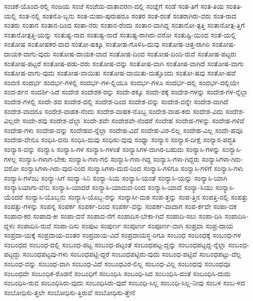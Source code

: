{ಸಂಚಿಕೆ-ಯೊಂದ-ರಲ್ಲಿ
ಸಂಜಯ
ಸಂಜೆ
ಸಂಜೆಯ-ವಾತಾವರಣ-ದಲ್ಲಿ
ಸಂಜ್ಞೆಗೆ
ಸಂಡೆ
ಸಂತ-ತಿಗೆ
ಸಂತ-ತಿಯ
ಸಂತತಿ-ಯಲ್ಲಿ
ಸಂತ-ನಲ್ಲಿ
ಸಂತನೊ-ಬ್ಬನು
ಸಂತ-ಮಹಾ-ಪುರುಷರೂ
ಸಂತರ
ಸಂತ-ರಂತೆ
ಸಂತರಾಗಿರು-ವರು
ಸಂತ-ರಾದ
ಸಂತರು
ಸಂತಾನ
ಸಂತಾನ-ದಿಂದ
ಸಂತಾ-ನರು
ಸಂತಾನ-ರೆಂದು
ಸಂತಾನ-ವಾಗಿದ್ದ
ಸಂತಾನೋ-ತ್ಪತ್ತಿ
ಸಂತಾನೋತ್ಪ-ತ್ತಿಗೆ
ಸಂತಾನೋತ್ಪತ್ತಿ-ಯನ್ನು
ಸಂತುಷ್ಟ-ನಾದ
ಸಂತುಷ್ಟ-ನಾದೆ
ಸಂತುಷ್ಟ-ರಾಗಿರು-ವರೋ
ಸಂತುಷ್ಟಿ-ಯಿಂದ
ಸಂತೆ-ಯಲ್ಲಿ
ಸಂತೋಷ
ಸಂತೋಷಕರ-ವಾದ
ಸಂತೋ-ಷಕ್ಕೂ
ಸಂತೋಷ-ಗೊಳಿಸಿ-ದುವು
ಸಂತೋಷ-ಚಿತ್ತ-ರಾಗಿರಿ
ಸಂತೋಷ-ದಾಯಕ-ವಾಗು-ವುದು
ಸಂತೋಷ-ದಾಯಕ-ವಾದ
ಸಂತೋಷ-ದಿಂದ
ಸಂತೋಷ-ದಿಂದಿ-ರುವೆ
ಸಂತೋಷ-ಪಟ್ಟರು
ಸಂತೋಷ-ಪಟ್ಟರೆ
ಸಂತೋಷ-ಪಡು-ವರು
ಸಂತೋಷ-ವನ್ನು
ಸಂತೋಷ-ವಾಗಿ
ಸಂತೋಷ-ವಾಗಿದೆ
ಸಂತೋಷ-ವಾಗು
ಸಂತೋಷ-ವಾಗು-ವುದು
ಸಂತೋಷ-ವಾಯಿತು
ಸಂತೋಷ-ವಾಯಿತು-ಮತ್ತೊಂದು
ಸಂತೋ-ಷವು
ಸಂತೋ-ಷವೆ
ಸಂದಣಿ
ಸಂದರ್ಭ
ಸಂದರ್ಭ-ಗಳಲ್ಲಿ
ಸಂದರ್ಭ-ಗಳ-ಲ್ಲಿಯೂ
ಸಂದರ್ಭ-ಗಳೂ
ಸಂದರ್ಭ-ದಲ್ಲಿ
ಸಂದರ್ಭ-ದಲ್ಲಿಯೇ
ಸಂದ-ರ್ಶನ
ಸಂದರ್ಶಿ-ಸಿದೆ
ಸಂದೇಶ
ಸಂದೇಶಕ-ರನ್ನು
ಸಂದೇ-ಶಕ್ಕೂ
ಸಂದೇ-ಶಕ್ಕೆ
ಸಂದೇಶ-ಗಳನ್ನು
ಸಂದೇಶ-ಗಳ-ನ್ನೆಲ್ಲಾ
ಸಂದೇಶ-ಗಳಲ್ಲಿ
ಸಂದೇ-ಶದ
ಸಂದೇಶ-ದಲ್ಲಿ
ಸಂದೇಶ-ದಿಂದ
ಸಂದೇಶ-ವನ್ನು
ಸಂದೇಶ-ವನ್ನೇ
ಸಂದೇಶ-ವಾಗಿದೆ
ಸಂದೇಶ-ವಾದರೂ
ಸಂದೇಶ-ವಾಹಕ-ನೆಂದು
ಸಂದೇಶ-ವಾಹಕ-ನೊಬ್ಬ
ಸಂದೇಶ-ವಾಹ-ಕರು
ಸಂದೇಶ-ವಿದು
ಸಂದೇಶ-ವಿಲ್ಲದೇ
ಸಂದೇ-ಶವು
ಸಂದೇಶ-ವೆಲ್ಲಾ
ಸಂದೇ-ಶವೇ
ಸಂದೇಶವೇ-ನೆಂದರೆ
ಸಂದೇಹ
ಸಂದೇಹ-ಗಳನ್ನು
ಸಂದೇಹ-ಗಳಿವೆ
ಸಂದೇಹ-ಗಳು
ಸಂದೇಹ-ವನ್ನು
ಸಂದೇಹವ-ನ್ನೆಲ್ಲಾ
ಸಂದೇಹ-ವಿದೆ
ಸಂದೇಹ-ವಿರ-ಲಿಲ್ಲ
ಸಂದೇಹ-ವಿಲ್ಲ
ಸಂದೇ-ಹವೂ
ಸಂದೇಹ-ವೇನೂ
ಸಂಧಿಸಿ-ದನು
ಸಂಧಿಸಿ-ದುವು
ಸಂಧಿಸು-ವುವು
ಸಂಧ್ಯಾ
ಸಂನ್ಯಾಸ
ಸಂನ್ಯಾಸ-ದೀಕ್ಷೆ
ಸಂನ್ಯಾಸ-ಪದ್ಧತಿ
ಸಂನ್ಯಾಸ-ವನ್ನು
ಸಂನ್ಯಾಸಿ
ಸಂನ್ಯಾಸಿ-ಗಳ
ಸಂನ್ಯಾಸಿ-ಗಳಂತೆ
ಸಂನ್ಯಾಸಿಗಳ-ದಾಗಿರ-ಬಹುದು
ಸಂನ್ಯಾಸಿ-ಗಳನ್ನು
ಸಂನ್ಯಾಸಿ-ಗಳಲ್ಲ
ಸಂನ್ಯಾಸಿ-ಗಳಾಗ-ಬೇಕು
ಸಂನ್ಯಾಸಿ-ಗಳಾ-ಗಲಿ
ಸಂನ್ಯಾಸಿ-ಗಳಾ-ಗಿದ್ದ
ಸಂನ್ಯಾಸಿ-ಗಳಾ-ಗಿದ್ದರು
ಸಂನ್ಯಾಸಿಗಳಾ-ಗಿರು-ವರೋ
ಸಂನ್ಯಾಸಿಗಳಾ-ಗಿರು-ವುದ-ರಿಂದ
ಸಂನ್ಯಾಸಿಗಳಾ-ದುದ-ರಿಂದ
ಸಂನ್ಯಾಸಿ-ಗಳಿಗೂ
ಸಂನ್ಯಾಸಿ-ಗಳಿಗೆ
ಸಂನ್ಯಾಸಿ-ಗಳು
ಸಂನ್ಯಾಸಿ-ಗಳೆಂಬ
ಸಂನ್ಯಾ-ಸಿಗೆ
ಸಂನ್ಯಾ-ಸಿನಿ
ಸಂನ್ಯಾ-ಸಿಯ
ಸಂನ್ಯಾಸಿ-ಯಂತೆ
ಸಂನ್ಯಾಸಿ-ಯನ್ನು
ಸಂನ್ಯಾಸಿ-ಯಾಗಿ
ಸಂನ್ಯಾಸಿಯಾಗು-ವೆನು
ಸಂನ್ಯಾಸಿ-ಯಾದರೆ
ಸಂನ್ಯಾಸಿ-ಯಾದುದ-ರಿಂದ
ಸಂನ್ಯಾಸಿ-ಯಾದೆ
ಸಂನ್ಯಾ-ಸಿಯು
ಸಂನ್ಯಾಸಿ-ಯೆಂದರೆ
ಸಂನ್ಯಾಸಿ-ಯೊಬ್ಬನು
ಸಂನ್ಯಾಸಿ-ಯೊಬ್ಬ-ರನ್ನು
ಸಂನ್ಯಾಸೀ-ಮಠ
ಸಂಪ-ತ್ತನ್ನು
ಸಂಪ-ತ್ತಿನ
ಸಂಪತ್ತಿ-ನಲ್ಲಿ
ಸಂಪತ್ತು
ಸಂಪತ್ತು-ಗಳನ್ನು
ಸಂಪನ್ನ
ಸಂಪರ್ಕ
ಸಂಪರ್ಕ-ದಿಂದ
ಸಂಪರ್ಕ-ವನ್ನು
ಸಂಪರ್ಕ-ವಾದಾಗ
ಸಂಪ-ರ್ಕವೇ
ಸಂಪಾ-ದಕ
ಸಂಪಾದ-ಕರ
ಸಂಪಾದ-ಕೀ
ಸಂಪಾ-ದನೆ
ಸಂಪಾದ-ನೆಗೆ
ಸಂಪಾದಿಸ-ಬೇಕಾ-ಗಿದೆ
ಸಂಪಾದಿ-ಸಲು
ಸಂಪಾ-ದಿಸಿ
ಸಂಪಾದಿಸಿ-ದ್ದಳು
ಸಂಪಾದಿಸಿ-ರುವೆ
ಸಂಪಾ-ದಿಸು
ಸಂಪುಟ
ಸಂಪುರ್ಣ
ಸಂಪೂರ್ಣ
ಸಂಪೂರ್ಣ-ವಾಗಿ
ಸಂಪ್ರದಾ
ಸಂಪ್ರ-ದಾಯ
ಸಂಪ್ರದಾ-ಯಕ್ಕೆ
ಸಂಪ್ರದಾಯ-ವಂತರ
ಸಂಪ್ರದಾಯ-ವಿದೆ
ಸಂಪ್ರದಾಯಸ್ಥ-ರಿಗೂ
ಸಂಬಂಧ
ಸಂಬಂಧಕ್ಕೆ
ಸಂಬಂಧ-ಗಳ
ಸಂಬಂಧದ
ಸಂಬಂಧ-ದಲ್ಲಿ
ಸಂಬಂಧ-ಪಟ್ಟ
ಸಂಬಂಧ-ಪಟ್ಟಂತೆ
ಸಂಬಂಧಪಟ್ಟ-ದ್ದನ್ನು
ಸಂಬಂಧಪಟ್ಟದ್ದ-ನ್ನೆಲ್ಲಾ
ಸಂಬಂಧ-ಪಟ್ಟದ್ದು
ಸಂಬಂಧಪಟ್ಟವು-ಗಳು
ಸಂಬಂಧಪಟ್ಟಿ-ದ್ದರೆ
ಸಂಬಂಧಪಟ್ಟಿರು-ವುದು
ಸಂಬಂಧ-ಪಟ್ಟಿವೆ
ಸಂಬಂಧಪಟ್ಟು-ದೆಲ್ಲ
ಸಂಬಂಧ-ವನ್ನು
ಸಂಬಂಧ-ವಾಗಿ
ಸಂಬಂಧ-ವಿದೆ
ಸಂಬಂಧವಿರ-ಲಿಲ್ಲ
ಸಂಬಂಧ-ವಿಲ್ಲ
ಸಂಬಂಧವು
ಸಂಬಂಧವೂ
ಸಂಬಂಧವೇ
ಸಂಬಂಧಿಕ-ರೊಡನೆ
ಸಂಬಂಧಿಗೆ
ಸಂಬಂಧಿಸಿ
ಸಂಬಂಧಿ-ಸಿದ
ಸಂಬಂಧಿಸಿ-ದಂತೆ
ಸಂಬಂಧಿಸಿ-ದುದು
ಸಂಬಂಧಿಸಿ-ರುವ
ಸಂಬಂಧಿಸಿರು-ವುದು
ಸಂಬಂಧಿಸಿರು-ವುದೆ
ಸಂಬಂಧಿ-ಸಿಲ್ಲ
ಸಂಬಂಧಿ-ಸಿಲ್ಲ-ನೀವು
ಸಂಬಳ
ಸಂಬ-ಳದ
ಸಂಬೋಧಿಸು-ತ್ತಲೇ
ಸಂಬೋಧಿಸು-ತ್ತಿರುವೆ
ಸಂಬೋಧಿಸು-ತ್ತೇನೆ
}
